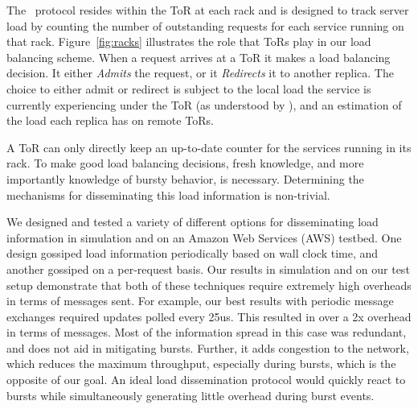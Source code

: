 The \systemname\ protocol resides within the ToR at each rack and is designed to
track server load by counting the number of outstanding requests for each
service running on that rack. Figure~\ref{fig:racks} illustrates the role that
ToRs play in our load balancing scheme.  When a request arrives at a ToR it
makes a load balancing decision. It either \textit{Admits} the request, or it
\textit{Redirects} it to another replica. The choice to either admit or
redirect is subject to the local load the service is currently experiencing
under the ToR (as understood by \systemname), and an estimation of the load
each replica has on remote ToRs. 


A ToR can only directly keep an up-to-date counter for the services running in
its rack. To make good load balancing decisions, fresh knowledge, and more
importantly knowledge of bursty behavior, is necessary.  Determining the
mechanisms for disseminating this load information is non-trivial.

We designed and tested a variety of different options for disseminating load
information in simulation and on an Amazon Web Services (AWS) testbed.  One
design gossiped load information periodically based on wall clock time, and
another gossiped on a per-request basis. Our results in simulation and on our
test setup demonstrate that both of these techniques require extremely high
overheads in terms of messages sent.  For example, our best results with
periodic message exchanges required updates polled every 25us. This resulted in
over a 2x overhead in terms of messages. Most of the information spread in this
case was redundant, and does not aid in mitigating bursts.  Further, it adds
congestion to the network, which reduces the maximum throughput, especially
during bursts, which is the opposite of our goal. An ideal load dissemination
protocol would quickly react to bursts while simultaneously generating little
overhead during burst events.

